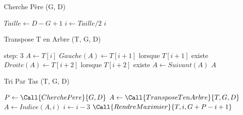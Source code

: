 \documentclass{article}
\begin{document}
\begin{algorithm}
	\begin{algorithmic}[1]
		\caption{Cherche Père (G, D)}
		\State $ Taille \gets D - G + 1 $
		\State $ i \gets Taille / 2 $
		\Return $i$
	\end{algorithmic}
\end{algorithm}

\begin{algorithm}
	\begin{algorithmic}[2]
		\caption{Transpose T en Arbre (T, G, D)}
		 step: 3
			\State $ A \gets T[i] $
			\State $ Gauche(A) \gets T[i+1]$ lorsque $T[i+1]$ existe
			\State $ Droite(A) \gets T[i+2]$ lorsque $T[i+2]$ existe
			\State $ A \gets Suivant(A) $
		\EndFor
		\Return $A$
	\end{algorithmic}
\end{algorithm}

\begin{algorithm}
	\begin{algorithmic}[3]
		\caption{Tri Par Tas (T, G, D)}
		\State $ P \gets \Call{Cherche Pere}{G, D} $
		\State $ A \gets \Call{Transpose T en Arbre}{T, G, D} $
			\State $ A \gets Indice(A, i) $
			\State $ i \gets i - 3 $
			\State $ \Call{Rendre Maximier}{T, i, G + P - i + 1} $
		\EndFor
	\end{algorithmic}
\end{algorithm}
\end{document}
